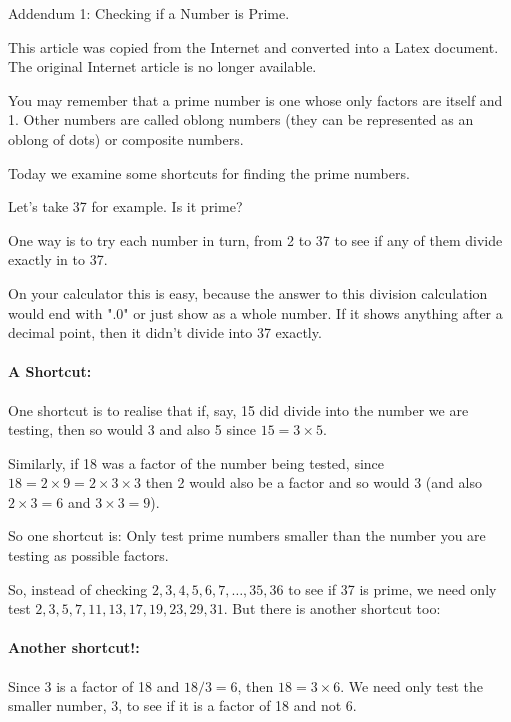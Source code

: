 \documentclass[12pt]{article}
\begin{document}
\clearpage
\noindent%
\begin{center}
  {\Large Addendum 1: Checking if a Number is Prime.}\par    
  {\color{red} \footnotesize This article was copied from the Internet and converted into a Latex document. The original Internet article is no longer available.}
\end{center}
\vspace{10pt}

 
You may remember that a prime number is one whose only factors are itself and 1. Other numbers are called oblong numbers (they can be represented as an oblong of dots) or composite numbers.

Today we examine some shortcuts for finding the prime numbers.

Let's take 37 for example. Is it prime?

One way is to try each number in turn, from 2 to 37 to see if any of them divide exactly in to 37.

On your calculator this is easy, because the answer to this division calculation would end with ".0" or just show as a whole number. If it shows anything after a decimal point, then it didn't divide into 37 exactly.

\paragraph{A Shortcut:} One shortcut is to realise that if, say, 15 did divide into the number we are testing, then so would 3 and also 5 since $15 = 3 \times 5$.

Similarly, if 18 was a factor of the number being tested, since $18 = 2 \times 9 = 2 \times 3 \times 3$ then 2 would also be a factor and so would 3 (and also $2 \times 3 = 6$ and $3 \times 3 = 9$).

So one shortcut is: Only test prime numbers smaller than the number you are testing as possible factors.

So, instead of checking $2,3,4,5,6,7,\dots,35,36$ to see if 37 is prime, we need only test $2,3,5,7,11,13,17,19,23,29,31$. But there is another shortcut too:

\paragraph{Another shortcut!:} Since 3 is a factor of 18 and $18 / 3 = 6$, then $18 = 3 \times 6$. We need only test the smaller number, 3, to see if it is a factor of 18 and not 6.
\end{document}
